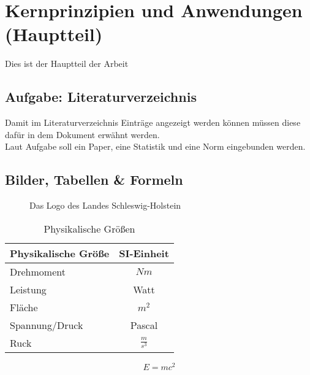 
\chapter{Kernprinzipien und Anwendungen (Hauptteil)}

Dies ist der Hauptteil der Arbeit

\section{Aufgabe: Literaturverzeichnis}
Damit im Literaturverzeichnis Einträge angezeigt werden können müssen diese dafür in dem Dokument erwähnt werden.
\\
Laut Aufgabe soll ein Paper\cite{Shute.2024}, eine Statistik\cite{Statista.08.10.2024} und eine Norm\cite{DIN-EN-ISO-9241-11.} eingebunden werden.


\section{Bilder, Tabellen \& Formeln}
\label{sect:bilder}

\begin{figure}[htbp]
	\centering
	
	\caption{Das Logo des Landes Schleswig-Holstein}
	\label{fig:land-sh}
\end{figure}

\vfill

\begin{table}[htbp]
	\centering
	\caption{Physikalische Größen}
	\begin{tabular}{lc}
		\toprule
		Physikalische Größe & SI-Einheit \\
		\midrule
		Drehmoment & $Nm$ \\
		Leistung & Watt \\
		Fläche & $m^2$ \\
		Spannung/Druck & Pascal \\
		Ruck & $\frac{m}{s^3}$ \\
		\bottomrule
	\end{tabular}
	\label{tab:physikalische_größen}
\end{table}


\begin{gleichung}[b]
	\centering
	\begin{equation}
		E = mc^2
	\label{eq:emc2}
	\end{equation}
	\caption{Die Formel der Energie-Masse-Äquivalenz}
\end{gleichung}

